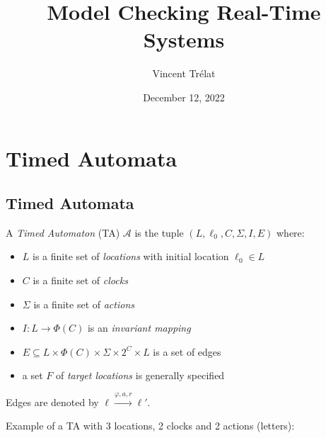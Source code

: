 \documentclass{beamer}
\title[Model Checking Real-Time Systems]{Model Checking Real-Time Systems}
\date{December 12, 2022}
\author[V. Trélat]{Vincent Trélat}
\institute[TUM]{Technical University of Munich}
\theoremstyle{definition}
\begin{document}
\begin{frame}
\titlepage
\end{frame}

\begin{frame}
\tableofcontents
\end{frame}

\section{Timed Automata}

\subsection{Timed Automata}

\begin{frame}
  \begin{definition}
    A \emph{Timed Automaton} (TA) $\mathcal{A}$ is the tuple $(L, \ell_0, C, \Sigma, I, E)$ where:
    \begin{itemize}
      \item $L$ is a finite set of \emph{locations} with initial location $\ell_0 \in L$
      \item $C$ is a finite set of \emph{clocks}
      \item $\Sigma$ is a finite set of \emph{actions}
      \item $I \colon L \to \varPhi(C)$ is an \emph{invariant mapping}
      \item $E \subseteq L \times \varPhi(C) \times \Sigma \times 2^{C} \times L$ is a set of edges
      \item a set $F$ of \emph{target locations} is generally specified
    \end{itemize}
  \end{definition}
  \vfill
  Edges are denoted by $\ell \xrightarrow{\varphi, a, r} \ell'$.
\end{frame}
\begin{frame}
  Example of a TA with 3 locations, 2 clocks and 2 actions (letters):
\end{frame}
\end{document}
